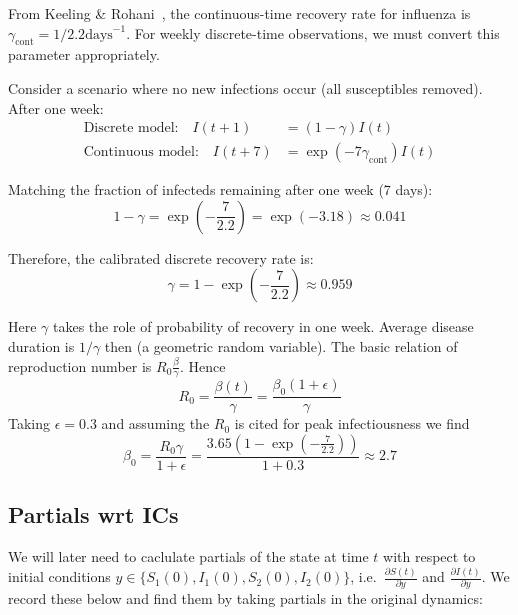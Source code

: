 From Keeling \& Rohani~\cite{keeling2008modeling}, the continuous-time
recovery rate for influenza is $\gamma_{\text{cont}} = 1/2.2 \text{
  days}^{-1}$. For weekly discrete-time observations, we must convert
this parameter appropriately.

Consider a scenario where no new infections occur (all susceptibles
removed). After one week:
\begin{align}
\text{Discrete model:} \quad I(t+1) &= (1-\gamma) I(t) \\
\text{Continuous model:} \quad I(t+7) &= \exp(-7\gamma_{\text{cont}}) I(t)
\end{align}

Matching the fraction of infecteds remaining after one week (7 days):
\begin{equation}
1 - \gamma = \exp\left(-\frac{7}{2.2}\right) = \exp(-3.18) \approx 0.041
\end{equation}

Therefore, the calibrated discrete recovery rate is:
\begin{equation}
\gamma = 1 - \exp\left(-\frac{7}{2.2}\right) \approx 0.959
\end{equation}


Here $\gamma$ takes the role of probability of recovery in one
week. Average disease duration is $1/ \gamma$ then (a geometric random
variable). The basic relation of reproduction number is $R_0
\frac{\beta}{\gamma}$. Hence
\begin{equation}
  R_0 = \frac{\beta(t)}{\gamma} = \frac{\beta_0 (1+\epsilon)}{\gamma}
\end{equation}
Taking $\epsilon = 0.3$ and assuming the $R_0$ is cited for peak infectiousness we find
$$
\beta_0 = \frac{R_0 \gamma}{1+\epsilon} = \frac{3.65 (1-\exp\left (-\frac{7}{2.2} \right))}{1+0.3} \approx 2.7
$$

\subsection{Partials wrt ICs}
We will later need to caclulate partials of the state at time $t$ with
respect to initial conditions $y \in \{S_1(0), I_1(0), S_2(0),
I_2(0)\}$, i.e.~$\frac{\partial S(t)}{\partial y}$ and $\frac{\partial
  I(t)}{\partial y}$. We record these below and find them by taking
partials in the original dynamics:

